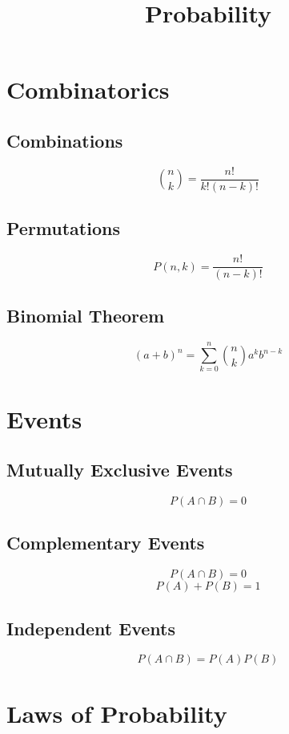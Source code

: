 \documentclass{article}
\title{Probability}
\date{}
\begin{document}
\maketitle

\tableofcontents

\newpage
\section{Combinatorics}

\subsection{Combinations}
\[
    \binom{n}{k} = \frac{n!}{k!(n-k)!}
\]

\subsection{Permutations}
\[
    P(n, k) = \frac{n!}{(n-k)!}
\]

\subsection{Binomial Theorem}
\[
    (a+b)^n = \sum_{k=0}^{n} \binom{n}{k} a^k b^{n-k}
\]

\newpage
\section{Events}

\subsection{Mutually Exclusive Events}
\[
    P(A \cap B) = 0
\]

\subsection{Complementary Events}
\[
    P(A \cap B) = 0
\]
\[
    P(A) + P(B) = 1
\]

\subsection{Independent Events}
\[
    P(A \cap B) = P(A)P(B)
\]

\newpage
\section{Laws of Probability}
\end{document}

